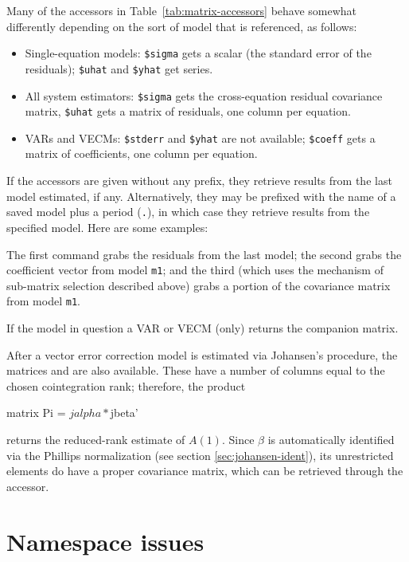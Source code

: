 Many of the accessors in Table~\ref{tab:matrix-accessors} behave
somewhat differently depending on the sort of model that is
referenced, as follows:

\begin{itemize}
\item Single-equation models: \texttt{\$sigma} gets a scalar (the
  standard error of the residuals); \texttt{\$uhat} and
  \texttt{\$yhat} get series.
\item All system estimators: \texttt{\$sigma} gets the cross-equation
  residual covariance matrix, \texttt{\$uhat} gets a matrix of
  residuals, one column per equation.  
\item VARs and VECMs: \texttt{\$stderr} and \texttt{\$yhat} are not
  available; \texttt{\$coeff} gets a matrix of coefficients, one
  column per equation.
\end{itemize}

If the accessors are given without any prefix, they retrieve results
from the last model estimated, if any.  Alternatively, they may be
prefixed with the name of a saved model plus a period (\texttt{.}), in
which case they retrieve results from the specified model.  Here are
some examples:
%
The first command grabs the residuals from the last model; the second
grabs the coefficient vector from model \texttt{m1}; and the third
(which uses the mechanism of sub-matrix selection described above)
grabs a portion of the covariance matrix from model \texttt{m1}.

If the model in question a VAR or VECM (only)  returns
the companion matrix.

After a vector error correction model is estimated via Johansen's
procedure, the matrices  and  are
also available. These have a number of columns equal to the chosen
cointegration rank; therefore, the product
\begin{code}
matrix Pi = $jalpha * $jbeta'
\end{code}
returns the reduced-rank estimate of $A(1)$. Since $\beta$ is
automatically identified via the Phillips normalization (see section
\ref{sec:johansen-ident}), its unrestricted elements do have a proper
covariance matrix, which can be retrieved through the
 accessor.

\section{Namespace issues}
\label{matrix-namespace}

